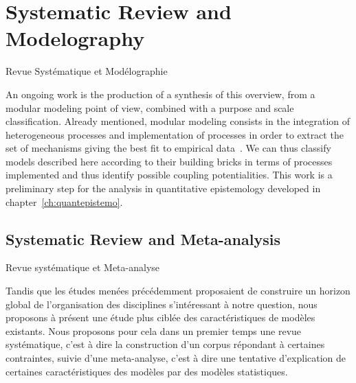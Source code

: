 





\section{Systematic Review and Modelography}{Revue Systématique et Modélographie}


An ongoing work is the production of a synthesis of this overview, from a modular modeling point of view, combined with a purpose and scale classification. Already mentioned, modular modeling consists in the integration of heterogeneous processes and implementation of processes in order to extract the set of mechanisms giving the best fit to empirical data~\cite{cottineau2015incremental}. We can thus classify models described here according to their building bricks in terms of processes implemented and thus identify possible coupling potentialities. This work is a preliminary step for the analysis in quantitative epistemology developed in chapter~\ref{ch:quantepistemo}.



\subsection[Systematic Review][Revue Systématique]{Systematic Review and Meta-analysis}{Revue systématique et Meta-analyse}


Tandis que les études menées précédemment proposaient de construire un horizon global de l'organisation des disciplines s'intéressant à notre question, nous proposons à présent une étude plus ciblée des caractéristiques de modèles existants. Nous proposons pour cela dans un premier temps une revue systématique, c'est à dire la construction d'un corpus répondant à certaines contraintes, suivie d'une meta-analyse, c'est à dire une tentative d'explication de certaines caractéristiques des modèles par des modèles statistiques.












